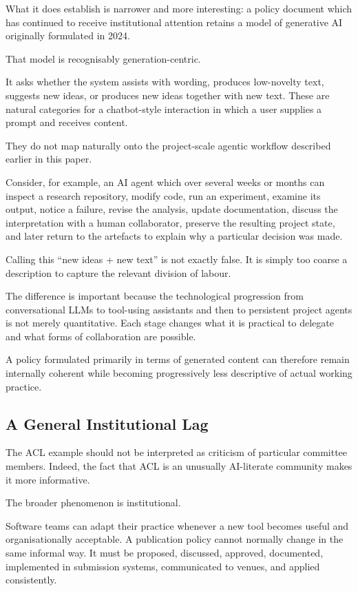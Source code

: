 What it does establish is narrower and more interesting: a policy document which has continued to receive institutional attention retains a model of generative AI originally formulated in 2024.

That model is recognisably generation-centric.

It asks whether the system assists with wording, produces low-novelty text, suggests new ideas, or produces new ideas together with new text. These are natural categories for a chatbot-style interaction in which a user supplies a prompt and receives content.

They do not map naturally onto the project-scale agentic workflow described earlier in this paper.

Consider, for example, an AI agent which over several weeks or months can inspect a research repository, modify code, run an experiment, examine its output, notice a failure, revise the analysis, update documentation, discuss the interpretation with a human collaborator, preserve the resulting project state, and later return to the artefacts to explain why a particular decision was made.

Calling this ``new ideas + new text'' is not exactly false. It is simply too coarse a description to capture the relevant division of labour.

The difference is important because the technological progression from conversational LLMs to tool-using assistants and then to persistent project agents is not merely quantitative. Each stage changes what it is practical to delegate and what forms of collaboration are possible.

A policy formulated primarily in terms of generated content can therefore remain internally coherent while becoming progressively less descriptive of actual working practice.


\subsection{A General Institutional Lag}

The ACL example should not be interpreted as criticism of particular committee members. Indeed, the fact that ACL is an unusually AI-literate community makes it more informative.

The broader phenomenon is institutional.

Software teams can adapt their practice whenever a new tool becomes useful and organisationally acceptable. A publication policy cannot normally change in the same informal way. It must be proposed, discussed, approved, documented, implemented in submission systems, communicated to venues, and applied consistently.

